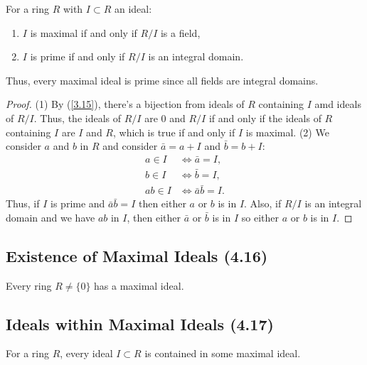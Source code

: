 For a ring $R$ with $I \subset R$ an ideal: \begin{enumerate}
    \item $I$ is maximal if and only if $R / I$ is a field,
    \item $I$ is prime if and only if $R / I$ is an integral domain.
\end{enumerate} Thus, every maximal ideal is prime since all
fields are integral domains.

\begin{proof}
    (1) By (\ref{3.15}), there's a bijection from ideals of $R$
    containing $I$ amd ideals of $R / I$. Thus, the ideals of $R / I$
    are $0$ and $R / I$ if and only if the ideals of $R$ containing
    $I$ are $I$ and $R$, which is true if and only if $I$ is maximal.
    \bs
    (2) We consider $a$ and $b$ in $R$ and consider $\bar{a} = a + I$
    and $\bar{b} = b + I$: \begin{align*}
        a \in I &\Longleftrightarrow \bar{a} = I, \\
        b \in I &\Longleftrightarrow \bar{b} = I, \\
        ab \in I &\Longleftrightarrow \bar{a}\bar{b} = I.
    \end{align*} Thus, if $I$ is prime and $\bar{a}\bar{b} = I$ then
    either $a$ or $b$ is in $I$. Also, if $R / I$ is an integral domain
    and we have $ab$ in $I$, then either $\bar{a}$ or $\bar{b}$ is in
    $I$ so either $a$ or $b$ is in $I$.
\end{proof}

\subsection{Existence of Maximal Ideals (4.16)} \label{4.16}

Every ring $R \neq \{0\}$ has a maximal ideal.

\subsection{Ideals within Maximal Ideals (4.17)} \label{4.17}

For a ring $R$, every ideal $I \subset R$ is contained in some
maximal ideal.
